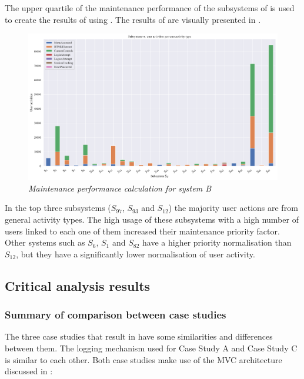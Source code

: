 

The upper quartile of the maintenance performance of the subsystems of  is used to create the results of  using . The results of  are visually presented in .

\clearpage

\begin{figure}[!htb]
	\centering %
	\includegraphics[width=0.95\linewidth]{img/ch3/analysis/case_C_subsystems_1.pdf}
	\caption[Maintenance performance calculation for system B]
	{\textit{Maintenance performance calculation for system B}}\label{fig:ch3_systemCBar}
\end{figure} 

In  the top three subsystems ($S_{97}$, $S_{93}$ and $S_{12}$) the majority user actions are from general activity types. The high usage of these subsystems with a high number of users linked to each one of them increased their maintenance priority factor. Other systems such as $S_{6}$, $S_{1}$ and $S_{82}$ have a higher priority normalisation than $S_{12}$, but they have a significantly lower normalisation of user activity. 

\subsection{Critical analysis results}\label{sec:ch3_criticalAnalysis}

\subsubsection{Summary of comparison between case studies}
The three case studies that result in  have some similarities and differences between them. The logging mechanism used for Case Study A and Case Study C is similar to each other. Both case studies make use of the MVC architecture discussed in :

